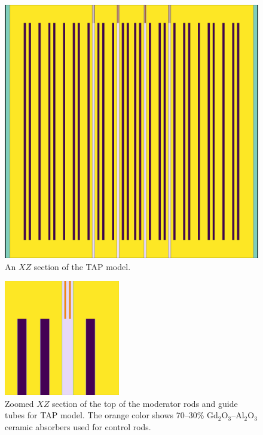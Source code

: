 \documentclass[12pt]{article} %
\begin{document}
\begin{figure}[htp!] %
  \centering
		  \includegraphics[width=\textwidth]{tap_elev_view.png}
  \caption{An $XZ$ section of the \gls{TAP} model.}
  \label{fig:tap-serpent-elev}
\end{figure}
\begin{figure}[htp!] %
  \centering
		  \includegraphics[width=0.45\textwidth]{tap_elev_view_zoomed.png}
  \caption{Zoomed $XZ$ section of the top of the moderator rods and guide tubes for \gls{TAP} model. The orange color shows 70–30\% Gd$_2$O$_3$–Al$_2$O$_3$ ceramic 
absorbers used for control rods.}
  \label{fig:tap-serpent-elev-zoom}
\end{figure}
\end{document}
